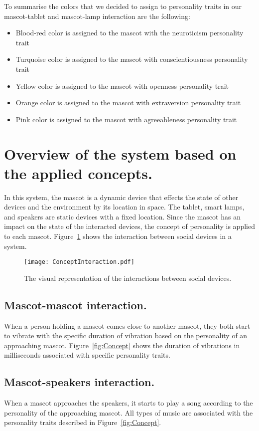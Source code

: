 To summarise the colors that we decided to assign to personality traits in our
mascot-tablet and mascot-lamp interaction are the following:
\begin{itemize}
\item Blood-red color is assigned to the mascot with the neuroticism personality trait
\item Turquoise color is assigned to the mascot with conscientiousness personality trait
\item Yellow color is assigned to the mascot with openness personality trait
\item Orange color is assigned to the mascot with extraversion personality trait
\item Pink color is assigned to the mascot with agreeableness personality trait
\end{itemize}


\section{Overview of the system based on the applied concepts.}
\label{sec:overview-of-the-system-based-on-the-applied-concepts.}
In this system, the mascot is a dynamic device that effects the state of other
devices and the environment by its location in space.
The tablet, smart lamps, and speakers are static devices with a fixed location.
Since the mascot has an impact on the state of the interacted devices,
the concept of personality is applied to each mascot.
Figure~\ref{fig:ConceptInteraction} shows the interaction between social devices in a system.
\begin{figure}[hbt!]
    \centering
    \texttt{[image: ConceptInteraction.pdf]}
    \caption{The visual representation of the interactions between social devices.}
    \label{fig:ConceptInteraction}
\end{figure}

\subsection*{Mascot-mascot interaction.}
When a person holding a mascot comes close to another mascot, they both start to vibrate with
the specific duration of vibration based on the personality of an approaching mascot.
Figure~\ref{fig:Concept} shows the duration of vibrations in milliseconds associated with
specific personality traits.

\subsection*{Mascot-speakers interaction.}
When a mascot approaches the speakers, it starts to play a song according to the personality of the approaching mascot.
All types of music are associated with the personality traits described in Figure~\ref{fig:Concept}.

